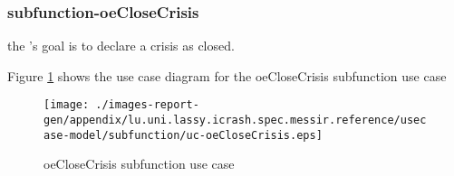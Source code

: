 
\subsubsection{subfunction-oeCloseCrisis}
\label{RE-use-case-oeCloseCrisis}



the 's goal is to declare a crisis as closed. 


\begin{usecase}
  









\end{usecase} 

Figure \ref{fig:lu.uni.lassy.icrash.spec.messir.reference-lu.uni.lassy.icrash.spec.messir.reference-RE-UCD-uc-oeCloseCrisis}
shows the use case diagram for the oeCloseCrisis subfunction use case

\begin{figure}[htbp]
\begin{center}

\texttt{[image: ./images-report-gen/appendix/lu.uni.lassy.icrash.spec.messir.reference/usecase-model/subfunction/uc-oeCloseCrisis.eps]}
\end{center}
\caption[lu.uni.lassy.icrash.spec.messir.reference Use Case Diagram: uc-oeCloseCrisis]{ oeCloseCrisis subfunction use case}
\label{fig:lu.uni.lassy.icrash.spec.messir.reference-lu.uni.lassy.icrash.spec.messir.reference-RE-UCD-uc-oeCloseCrisis}
\end{figure}
\vspace{0.5cm}
